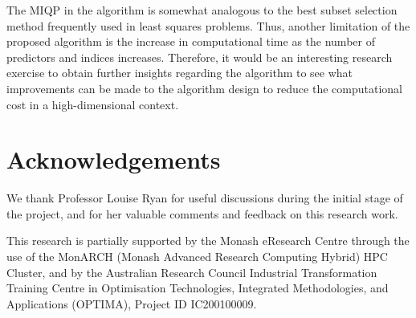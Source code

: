 \documentclass[
  11pt,
  a4paper,
]{article}
\begin{document}
The MIQP in the algorithm is somewhat analogous to the best subset
selection method frequently used in least squares problems. Thus,
another limitation of the proposed algorithm is the increase in
computational time as the number of predictors and indices increases.
Therefore, it would be an interesting research exercise to obtain
further insights regarding the algorithm to see what improvements can be
made to the algorithm design to reduce the computational cost in a
high-dimensional context.

\section*{Acknowledgements}\label{acknowledgements}

We thank Professor Louise Ryan for useful discussions during the initial
stage of the project, and for her valuable comments and feedback on this
research work.

This research is partially supported by the Monash eResearch Centre
through the use of the MonARCH (Monash Advanced Research Computing
Hybrid) HPC Cluster, and by the Australian Research Council Industrial
Transformation Training Centre in Optimisation Technologies, Integrated
Methodologies, and Applications (OPTIMA), Project ID IC200100009.


\printbibliography
\end{document}
